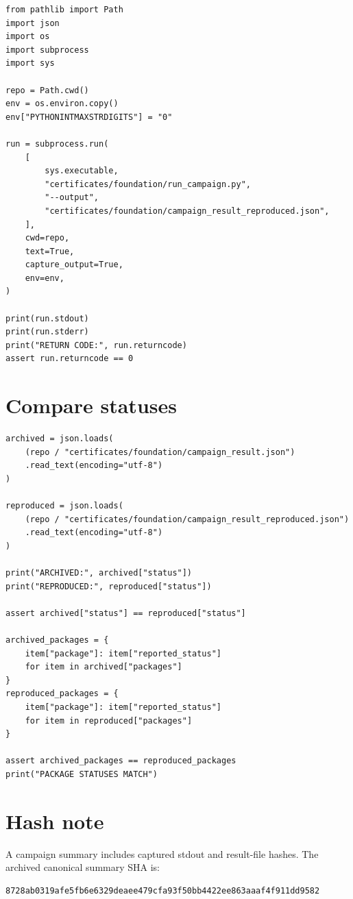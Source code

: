 \begin{verbatim}
from pathlib import Path
import json
import os
import subprocess
import sys

repo = Path.cwd()
env = os.environ.copy()
env["PYTHONINTMAXSTRDIGITS"] = "0"

run = subprocess.run(
    [
        sys.executable,
        "certificates/foundation/run_campaign.py",
        "--output",
        "certificates/foundation/campaign_result_reproduced.json",
    ],
    cwd=repo,
    text=True,
    capture_output=True,
    env=env,
)

print(run.stdout)
print(run.stderr)
print("RETURN CODE:", run.returncode)
assert run.returncode == 0
\end{verbatim}

\hypertarget{compare-statuses}{%
\section{Compare statuses}\label{compare-statuses}}

\begin{verbatim}
archived = json.loads(
    (repo / "certificates/foundation/campaign_result.json")
    .read_text(encoding="utf-8")
)

reproduced = json.loads(
    (repo / "certificates/foundation/campaign_result_reproduced.json")
    .read_text(encoding="utf-8")
)

print("ARCHIVED:", archived["status"])
print("REPRODUCED:", reproduced["status"])

assert archived["status"] == reproduced["status"]

archived_packages = {
    item["package"]: item["reported_status"]
    for item in archived["packages"]
}
reproduced_packages = {
    item["package"]: item["reported_status"]
    for item in reproduced["packages"]
}

assert archived_packages == reproduced_packages
print("PACKAGE STATUSES MATCH")
\end{verbatim}

\hypertarget{hash-note}{%
\section{Hash note}\label{hash-note}}

A campaign summary includes captured stdout and result-file hashes. The archived canonical summary SHA is:

\begin{verbatim}
8728ab0319afe5fb6e6329deaee479cfa93f50bb4422ee863aaaf4f911dd9582
\end{verbatim}

